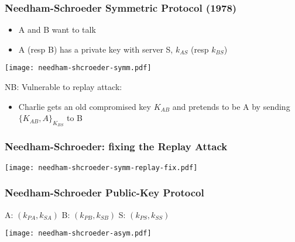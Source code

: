 \documentclass[
hyperref={pdfpagelabels=false}
,xcolor=table
]
{beamer}
\begin{document}
\begin{frame}
  \frametitle{Needham-Schroeder Symmetric Protocol (1978)}

  \begin{itemize}
  \item A and B want to talk
  \item A (resp B) has a private key with server S, $k_{AS}$ (resp $k_{BS}$)
  \end{itemize}

  
  \begin{center}
    \texttt{[image: needham-shcroeder-symm.pdf]}
  \end{center}

  NB: Vulnerable to replay attack: 
  \begin{itemize}
  \item Charlie gets an old compromised key $K_{AB}$ and pretends to be A by sending $\{K_{AB}, A\}_{K_{BS}}$ to B
  \end{itemize}
\end{frame}



\begin{frame}
  \frametitle{Needham-Schroeder: fixing the Replay Attack}

  \begin{center}
    \texttt{[image: needham-shcroeder-symm-replay-fix.pdf]}
  \end{center}
\end{frame}



\begin{frame}
  \frametitle{Needham-Schroeder Public-Key Protocol}

  A: $(k_{PA}, k_{SA})$    B: $(k_{PB}, k_{SB})$      S: $(k_{PS}, k_{SS})$  


  \begin{center}
    \texttt{[image: needham-shcroeder-asym.pdf]}
  \end{center}  
  
\end{frame}
\end{document}
